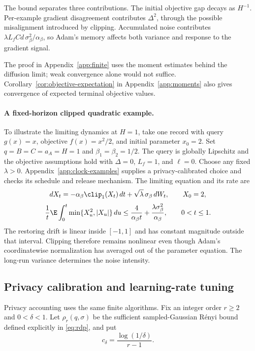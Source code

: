 The bound separates three contributions. The initial objective gap decays
as $H^{-1}$. Per-example gradient disagreement contributes $\Delta^2$, through the
possible misalignment introduced by clipping. Accumulated noise contributes
$\lambda L_fCd\,\sigma_\beta^2/\alpha_\beta$, so Adam's memory affects both
variance and response to the gradient signal.

The proof in Appendix~\ref{app:finite} uses the
moment estimates behind the diffusion limit; weak convergence alone would
not suffice. Corollary~\ref{cor:objective-expectation} in Appendix~\ref{app:moments}
also gives convergence of expected terminal objective values.

\paragraph{A fixed-horizon clipped quadratic example.}
To illustrate the limiting dynamics at $H=1$, take one record with query
$g(x)=x$, objective $f(x)=x^2/2$, and initial
parameter $x_0=2$. Set $q=B=C=a_A=H=1$ and
$\beta_1=\beta_2=1/2$. The query is globally Lipschitz and the objective assumptions hold with
$\Delta=0$, $L_f=1$, and $\ell=0$. Choose any fixed $\lambda>0$.
Appendix~\ref{app:clock-examples} supplies a privacy-calibrated choice
and checks its schedule and release mechanism. The limiting equation
and its rate are
\[
 dX_t=-\alpha_\beta\clip_1(X_t)\,dt
             +\sqrt{\lambda}\,\sigma_\beta\,dW_t,\qquad X_0=2,
\]
\begin{equation}\label{eq:example}
 \frac1t\E\int_0^t\min\{X_u^2,|X_u|\}\,du
       \leq\frac{4}{\alpha_\beta t}
                     +\frac{\lambda\sigma_\beta^2}{\alpha_\beta},
 \qquad 0<t\leq1.
\end{equation}
The restoring drift is linear inside $[-1,1]$ and has constant magnitude
outside that interval. Clipping therefore remains nonlinear even though
Adam's coordinatewise normalization has averaged out of the parameter
equation. The long-run variance determines the noise intensity.

\subsection{Privacy calibration and learning-rate tuning}

Privacy accounting uses the same finite algorithms. Fix an integer order
$r\geq2$ and $0<\delta<1$. Let $\rho_r(q,\sigma)$ be the
sufficient sampled-Gaussian R\'enyi bound defined explicitly in
\eqref{eq:rdp}, and put
\[
 c_\delta=\frac{\log(1/\delta)}{r-1}.
\]

